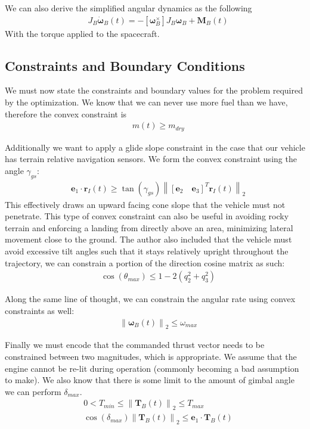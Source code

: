 We can also derive the simplified angular dynamics as the following
\begin{align}
& J_B \dot{\bm{\omega}}_B(t) = -\left[\bm{\omega}_B ^ \times\right] J_B \bm{\omega}_B + \mathbf{M}_B(t)
\end{align}
With the torque applied to the spacecraft.


\subsection{Constraints and Boundary Conditions}
We must now state the constraints and boundary values for the problem required by the optimization.
We know that we can never use more fuel than we have, therefore the convex constraint is 
\begin{align}
& m(t) \geq m_{dry}
\end{align}

Additionally we want to apply a glide slope constraint in the case that our vehicle has terrain relative navigation sensors. We form the convex constraint using the angle $\gamma_{gs}$:
\begin{align}
& \mathbf{e}_1 \cdot \mathbf{r}_I(t) \geq \tan(\gamma_{gs}) \left\lVert \left[\mathbf{e}_2 \quad \mathbf{e}_3\right]^T \mathbf{r}_I(t) \right\lVert_2
\end{align}
This effectively draws an upward facing cone slope that the vehicle must not penetrate. This type of convex constraint can also be useful in avoiding rocky terrain and enforcing a landing from directly above an area, minimizing lateral movement close to the ground.
The author also included that the vehicle must avoid excessive tilt angles such that it stays relatively upright throughout the trajectory, we can constrain a portion of the direction cosine matrix as such:
\begin{align}
& \cos(\theta_{max}) \leq 1-2(q_{2}^{2}+q_{3}^{2})
\end{align}

Along the same line of thought, we can constrain the angular rate using convex constraints as well:
\begin{align}
& \left \lVert \bm{\omega}_B(t) \right \lVert_2 \leq \omega_{max}
\end{align}

Finally we must encode that the commanded thrust vector needs to be constrained between two magnitudes, which is appropriate. We assume that the engine cannot be re-lit during operation (commonly becoming a bad assumption to make). We also know that there is some limit to the amount of gimbal angle we can perform $\delta_{max}$.
\begin{align}
& 0 < T_{min} \leq \left \lVert \bm{T}_B(t) \right \lVert_2 \leq T_{max} \\
& \cos(\delta_{max}) \left \lVert \bm{T}_B(t) \right \lVert_2 \leq \bm{e}_1 \cdot \bm{T}_B(t)
\end{align}

